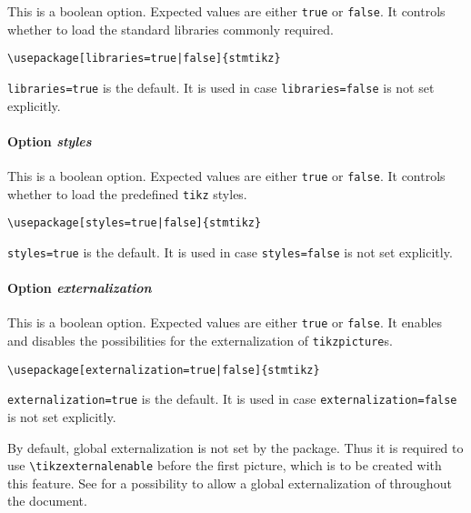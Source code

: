 \documentclass[%
  type=article,%
  layout=koma,%
  date=true,%
  hyperref=true,%
  listings=true,%
  tikz=false,%
]{stmtext}
\begin{document}
This is a boolean option. Expected values are either \texttt{true} or \texttt{false}. It controls whether to load the standard libraries commonly required.

\begin{verbatim}
\usepackage[libraries=true|false]{stmtikz}
\end{verbatim}

\texttt{libraries=true} is the default. It is used in case \texttt{libraries=false} is not set explicitly.

\paragraph{Option \protect\textit{styles}} 
\label{sec:usage:preamble:wholepackage:options:styles}

This is a boolean option. Expected values are either \texttt{true} or \texttt{false}. It controls whether to load the predefined \texttt{tikz} styles.

\begin{verbatim}
\usepackage[styles=true|false]{stmtikz}
\end{verbatim}

\texttt{styles=true} is the default. It is used in case \texttt{styles=false} is not set explicitly.

\paragraph{Option \protect\textit{externalization}} 
\label{sec:usage:preamble:wholepackage:options:externalization}

This is a boolean option. Expected values are either \texttt{true} or \texttt{false}. It enables and disables the possibilities for the externalization of \texttt{tikzpicture}s.

\begin{verbatim}
\usepackage[externalization=true|false]{stmtikz}
\end{verbatim}

\texttt{externalization=true} is the default. It is used in case \texttt{externalization=false} is not set explicitly.

By default, global externalization is not set by the package. Thus it is required to use \texttt{\textbackslash tikzexternalenable} before the first picture, which is to be created with this feature. See  for a possibility to allow a global externalization of throughout the document.
\end{document}
